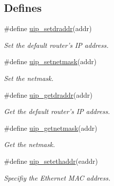 \subsection*{Defines}
\begin{CompactItemize}
\item 
\#define \hyperlink{a00061_g41d37ea1e3bd24f7b51e9409aceaaa80}{uip\_\-setdraddr}(addr)
\begin{CompactList}\small\item\em Set the default router's IP address. \item\end{CompactList}\item 
\#define \hyperlink{a00061_geb79c914cf137e6d27fd7583e5a66679}{uip\_\-setnetmask}(addr)
\begin{CompactList}\small\item\em Set the netmask. \item\end{CompactList}\item 
\#define \hyperlink{a00061_gd8e8bc9bc0e2ea4a24a8a024fd3a7f7c}{uip\_\-getdraddr}(addr)
\begin{CompactList}\small\item\em Get the default router's IP address. \item\end{CompactList}\item 
\#define \hyperlink{a00061_g5323320b7316647042016f17c4e881be}{uip\_\-getnetmask}(addr)
\begin{CompactList}\small\item\em Get the netmask. \item\end{CompactList}\item 
\#define \hyperlink{a00061_g30e827f33eacff55ecb4d8fb5a11d5d1}{uip\_\-setethaddr}(eaddr)
\begin{CompactList}\small\item\em Specifiy the Ethernet MAC address. \item\end{CompactList}\end{CompactItemize}
